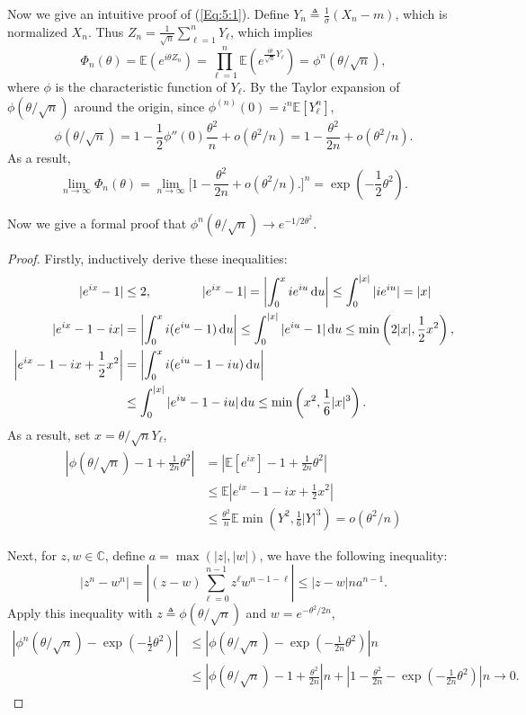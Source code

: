 Now we give an intuitive proof of (\ref{Eq:5:1}).
Define $Y_n\triangleq \frac{1}{\sigma}(X_n-m)$, which is normalized $X_n$.
Thus $Z_n = \frac{1}{\sqrt{n}}\sum_{\ell=1}^nY_\ell$, which implies
\[
\Phi_n(\theta) = \mathbb{E}(e^{i\theta Z_n}) = \prod_{\ell=1}^n
\mathbb{E}(e^{\frac{i\theta}{\sqrt{n}}Y_\ell}) = \phi^n(\theta/\sqrt{n}),
\]
where $\phi$ is the characteristic function of $Y_\ell$.
By the Taylor expansion of $\phi(\theta/\sqrt{n})$ around the origin, 
since $\phi^{(n)}(0) = i^n\mathbb{E}[Y_\ell^n]$,
\[
\phi(\theta/\sqrt{n}) = 1 -\frac{1}{2}\phi''(0)\frac{\theta^2}{n}+o(\theta^2/n)
=1 - \frac{\theta^2}{2n}+o(\theta^2/n).
\]
As a result,
\[
\lim_{n\to\infty}\Phi_n(\theta) = \lim_{n\to\infty}
\bigg[
1 - \frac{\theta^2}{2n}+o(\theta^2/n).
\bigg]^n = \exp\left(-\frac{1}{2}\theta^2\right).
\]

Now we give a formal proof that $\phi^n(\theta/\sqrt{n})\to e^{-1/2\theta^2}$.
\begin{proof}
Firstly, inductively derive these inequalities:
\begin{align*}
|e^{ix}-1|&\le 2,\qquad \qquad|e^{ix}-1|=\left|\int_0^xie^{iu}\,\mathrm{d} u\right|\le \int_0^{|x|}|ie^{iu}|=|x|\\
|e^{ix}-1-ix|&=\left|\int_0^xi(e^{iu}-1)\,\mathrm{d} u\right|\le \int_0^{|x|}|e^{iu}-1|\,\mathrm{d} u\le \min\left(2|x|,\frac{1}{2}x^2\right),\\
\left|e^{ix}-1-ix+\frac{1}{2}x^2\right|&=\left|
\int_0^xi(e^{iu}-1-iu)\,\mathrm{d} u
\right|\\
&\le \int_0^{|x|}|e^{iu}-1-iu|\,\mathrm{d} u\le \min\left(x^2,\frac{1}{6}|x|^3\right).
\end{align*}
As a result, set $x=\theta/\sqrt{n}Y_\ell$, 
\begin{align*}
\left|
\phi(\theta/\sqrt{n})-1+\frac{1}{2n}\theta^2
\right|&=\left|
\mathbb{E}[e^{ix}]
-1+\frac{1}{2n}\theta^2
\right|\\
&\le \mathbb{E}\left|
e^{ix}-1-ix+\frac{1}{2}x^2
\right|\\
&\le \frac{\theta^2}{n}\mathbb{E}\min\left(Y^2,\frac{1}{6}|Y|^3\right) = o(\theta^2/n)
\end{align*}

Next, for $z,w\in\mathbb{C}$, define $a=\max(|z|,|w|)$, we have the following inequality:
\[
|z^n - w^n| = \left|(z-w)\sum_{\ell=0}^{n-1}z^\ell w^{n-1-\ell}\right| \le |z-w|na^{n-1}.
\]
Apply this inequality with $z\triangleq \phi(\theta/\sqrt{n})$ and $w=e^{-\theta^2/2n}$,
\begin{align*}
\left|
\phi^n(\theta/\sqrt{n})-\exp\left(-\frac{1}{2}\theta^2\right)
\right|
&\le \left|
\phi(\theta/\sqrt{n})-\exp\left(-\frac{1}{2n}\theta^2\right)
\right|n\\
&\le
\left|
\phi(\theta/\sqrt{n})-1+\frac{\theta^2}{2n}
\right|n
+
\left|
1-\frac{\theta^2}{2n}-\exp\left(-\frac{1}{2n}\theta^2\right)
\right|n\to0.
\end{align*}



\end{proof}



